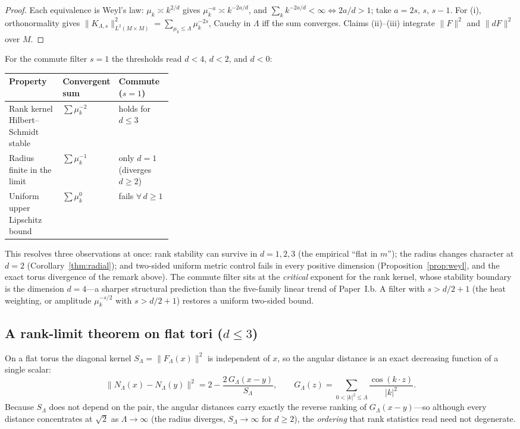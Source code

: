 \documentclass[review,supplement]{siamart220329}
\begin{document}
\begin{proof}
Each equivalence is Weyl's law: $\mu_k\asymp k^{2/d}$ gives $\mu_k^{-a}\asymp k^{-2a/d}$,
and $\sum_k k^{-2a/d}<\infty\iff 2a/d>1$; take $a=2s,\,s,\,s-1$. For (i), orthonormality
gives $\lVert K_{\Lambda,s}\rVert^2_{L^2(M\times M)}=\sum_{\mu_k\le\Lambda}\mu_k^{-2s}$,
Cauchy in $\Lambda$ iff the sum converges. Claims (ii)--(iii) integrate
$\lVert F\rVert^2$ and $\lVert dF\rVert^2$ over $M$.
\end{proof}

\noindent For the commute filter $s=1$ the thresholds read $d<4$, $d<2$, and $d<0$:
\begin{center}\small
\begin{tabular}{@{}lp{0.32\linewidth}l@{}}
\toprule
Property & Convergent sum & Commute ($s=1$) \\
\midrule
Rank kernel Hilbert--Schmidt stable & $\sum\mu_k^{-2}$ & holds for $d\le3$ \\
Radius finite in the limit & $\sum\mu_k^{-1}$ & only $d=1$ (diverges $d\ge2$) \\
Uniform upper Lipschitz bound & $\sum\mu_k^{0}$ & fails $\forall\,d\ge1$ \\
\bottomrule
\end{tabular}
\end{center}
This resolves three observations at once: rank stability can survive in $d=1,2,3$ (the
empirical ``flat in $m$''); the radius changes character at $d=2$
(Corollary~\ref{thm:radial}); and two-sided uniform metric control fails in every
positive dimension (Proposition~\ref{prop:weyl}, and the exact torus divergence of the
remark above). The commute filter sits at the \emph{critical} exponent for the rank
kernel, whose stability boundary is the dimension $d=4$---a sharper structural
prediction than the five-family linear trend of Paper~I.b. A filter with
$s>d/2+1$ (the heat weighting, or amplitude $\mu_k^{-s/2}$ with $s>d/2+1$) restores a
uniform two-sided bound.


\subsection*{A rank-limit theorem on flat tori ($d\le3$)}
On a flat torus the diagonal kernel $S_\Lambda=\lVert F_\Lambda(x)\rVert^2$ is
independent of $x$, so the angular distance is an exact decreasing function of a single
scalar:
\[
\lVert N_\Lambda(x)-N_\Lambda(y)\rVert^2=2-\frac{2\,G_\Lambda(x-y)}{S_\Lambda},
\qquad
G_\Lambda(z)=\sum_{0<\lvert k\rvert^2\le\Lambda}\frac{\cos(k\cdot z)}{\lvert k\rvert^2}.
\]
Because $S_\Lambda$ does not depend on the pair, the angular distances carry exactly
the reverse ranking of $G_\Lambda(x-y)$---so although every distance concentrates at
$\sqrt2$ as $\Lambda\to\infty$ (the radius diverges, $S_\Lambda\to\infty$ for
$d\ge2$), the \emph{ordering} that rank statistics read need not degenerate.
\end{document}
